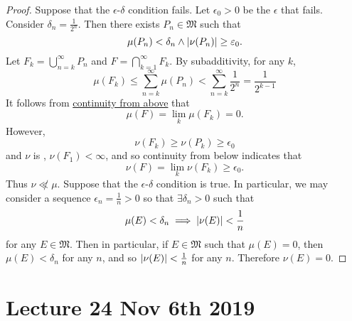 \documentclass[notoc,notitlepage]{tufte-book}
\begin{document}
\begin{proof}
  \hlbnoted{$\implies$}
  Suppose that the $\epsilon$-$\delta$ condition fails.
  Let $\epsilon_0 > 0$ be the $\epsilon$ that fails.
  Consider $\delta_n = \frac{1}{2^n}$.
  Then there exists $P_n \in \mathfrak{M}$ such that
  \begin{equation*}
    \mu(P_n) < \delta_n \land \left|\nu(P_n)\right| \geq \varepsilon_0.
  \end{equation*}
  Let $F_k = \bigcup_{n=k}^{\infty} P_n$ and $F = \bigcap_{k=1}^{\infty} F_k$.
  By subadditivity, for any $k$,
  \begin{equation*}
    \mu(F_k) \leq \sum_{n=k}^{\infty} \mu(P_n)
           < \sum_{n=k}^{\infty} \frac{1}{2^{n}} = \frac{1}{2^{k-1}}
  \end{equation*}
  It follows from \hyperref[thm:properties_of_a_measure]{continuity from above}
  that
  \begin{equation*}
    \mu(F) = \lim_{k} \mu(F_k) = 0.
  \end{equation*}
  However,
  \begin{equation*}
    \nu(F_k) \geq \nu(P_k) \geq \epsilon_0
  \end{equation*}
  and $\nu$ is , $\nu(F_1) < \infty$, and so
  continuity from below indicates that
  \begin{equation*}
    \nu(F) = \lim_{k} \nu(F_k) \geq \epsilon_0.
  \end{equation*}
  Thus $\nu \not\ll \mu$.
  \noindent
  \hlbnoted{$(\impliedby)$}
  Suppose that the $\epsilon$-$\delta$ condition is true.
  In particular, we may consider a sequence $\epsilon_n = \frac{1}{n} > 0$ so
  that $\exists \delta_n > 0$ such that
  \begin{equation*}
    \mu(E) < \delta_n \implies \left|\nu(E)\right| < \frac{1}{n}
  \end{equation*}
  for any $E \in \mathfrak{M}$.
  Then in particular, if $E \in \mathfrak{M}$ such that $\mu(E) = 0$,
  then $\mu(E) < \delta_n$ for any $n$, and so $\left|\nu(E)\right| < \frac{1}{n}$ for
  any $n$.
  Therefore $\nu(E) = 0$.
\end{proof}



\chapter{Lecture 24 Nov 6th 2019}%
\label{chp:lecture_24_nov_6th_2019}
\end{document}
